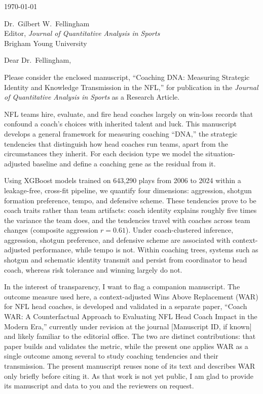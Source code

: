 \documentclass[12pt,USenglish]{article}
\begin{document}
\today

\medskip

Dr.\ Gilbert W.\ Fellingham\\
Editor, \emph{Journal of Quantitative Analysis in Sports}\\
Brigham Young University

\medskip

Dear Dr.\ Fellingham,

Please consider the enclosed manuscript, ``Coaching DNA: Measuring Strategic Identity and Knowledge Transmission in the NFL,'' for publication in the \emph{Journal of Quantitative Analysis in Sports} as a Research Article.

NFL teams hire, evaluate, and fire head coaches largely on win-loss records that confound a coach's choices with inherited talent and luck. This manuscript develops a general framework for measuring coaching ``DNA,'' the strategic tendencies that distinguish how head coaches run teams, apart from the circumstances they inherit. For each decision type we model the situation-adjusted baseline and define a coaching gene as the residual from it.

Using XGBoost models trained on 643{,}290 plays from 2006 to 2024 within a leakage-free, cross-fit pipeline, we quantify four dimensions: aggression, shotgun formation preference, tempo, and defensive scheme. These tendencies prove to be coach traits rather than team artifacts: coach identity explains roughly five times the variance the team does, and the tendencies travel with coaches across team changes (composite aggression $r = 0.61$). Under coach-clustered inference, aggression, shotgun preference, and defensive scheme are associated with context-adjusted performance, while tempo is not. Within coaching trees, systems such as shotgun and schematic identity transmit and persist from coordinator to head coach, whereas risk tolerance and winning largely do not.

In the interest of transparency, I want to flag a companion manuscript. The outcome measure used here, a context-adjusted Wins Above Replacement (WAR) for NFL head coaches, is developed and validated in a separate paper, ``Coach WAR: A Counterfactual Approach to Evaluating NFL Head Coach Impact in the Modern Era,'' currently under revision at the journal [Manuscript ID, if known] and likely familiar to the editorial office. The two are distinct contributions: that paper builds and validates the metric, while the present one applies WAR as a single outcome among several to study coaching tendencies and their transmission. The present manuscript reuses none of its text and describes WAR only briefly before citing it. As that work is not yet public, I am glad to provide its manuscript and data to you and the reviewers on request.
\end{document}

